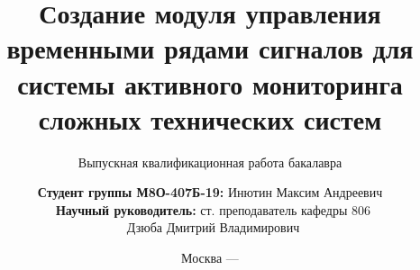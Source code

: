 \title{Создание модуля управления временными рядами сигналов для системы активного мониторинга сложных технических систем}

\subtitle{Выпускная квалификационная работа бакалавра}


\author[Инютин Максим Андреевич]
{
	\textbf{Студент группы М8О-407Б-19:} Инютин Максим Андреевич\\
	\ \textbf{Научный руководитель:} ст. преподаватель кафедры 806\\\ Дзюба Дмитрий Владимирович
}


\date{Москва --- \the\year}



